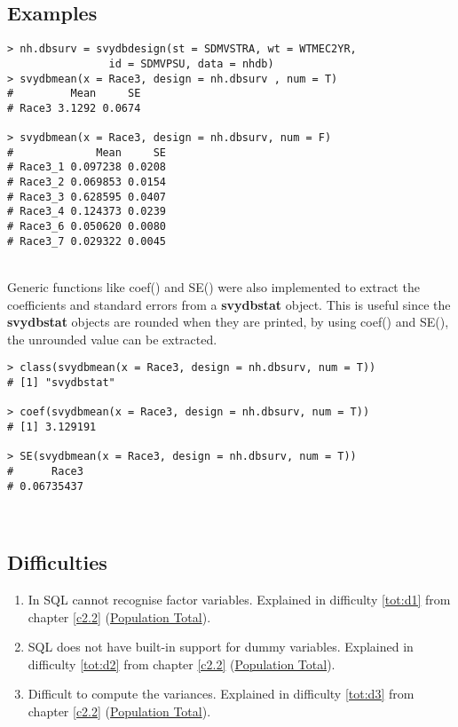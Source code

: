 \newpage
\subsection{Examples}
\begin{lstlisting}
> nh.dbsurv = svydbdesign(st = SDMVSTRA, wt = WTMEC2YR, 
                id = SDMVPSU, data = nhdb)
> svydbmean(x = Race3, design = nh.dbsurv , num = T)
#         Mean     SE
# Race3 3.1292 0.0674

> svydbmean(x = Race3, design = nh.dbsurv, num = F)
#             Mean     SE
# Race3_1 0.097238 0.0208
# Race3_2 0.069853 0.0154
# Race3_3 0.628595 0.0407
# Race3_4 0.124373 0.0239
# Race3_6 0.050620 0.0080
# Race3_7 0.029322 0.0045
\end{lstlisting}
\\

Generic functions like {\ttfamily coef()} and {\ttfamily SE()} were also implemented to extract the coefficients and standard errors from a {\bf svydbstat} object. This is useful since the {\bf svydbstat} objects are rounded when they are printed, by using {\ttfamily coef()} and {\ttfamily SE()}, the unrounded value can be extracted.
\begin{lstlisting}
> class(svydbmean(x = Race3, design = nh.dbsurv, num = T))
# [1] "svydbstat"

> coef(svydbmean(x = Race3, design = nh.dbsurv, num = T))
# [1] 3.129191

> SE(svydbmean(x = Race3, design = nh.dbsurv, num = T))
#      Race3 
# 0.06735437
\end{lstlisting}
\\
\subsection{Difficulties}
\begin{enumerate}
\item In {\sf SQL} cannot recognise factor variables. Explained in difficulty \ref{tot:d1} from chapter \ref{c2.2} (\hyperref[c2:tot]{Population Total}).

\item {\sf SQL} does not have built-in support for dummy variables. Explained in difficulty \ref{tot:d2} from chapter \ref{c2.2} (\hyperref[c2:tot]{Population Total}).

\item Difficult to compute the variances. Explained in difficulty \ref{tot:d3} from chapter \ref{c2.2} (\hyperref[c2:tot]{Population Total}).
\end{enumerate}

